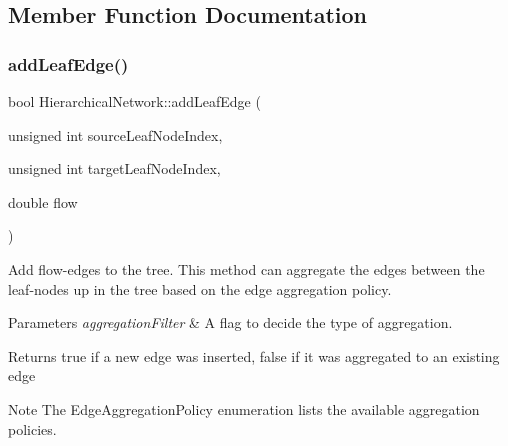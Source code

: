\subsection{Member Function Documentation}
\mbox{\label{classHierarchicalNetwork_afe1778c66f0b4444d70db38214b43ee1}} 
\subsubsection{\texorpdfstring{add\+Leaf\+Edge()}{addLeafEdge()}}
{\footnotesize\ttfamily bool Hierarchical\+Network\+::add\+Leaf\+Edge (\begin{DoxyParamCaption}\item[{unsigned int}]{source\+Leaf\+Node\+Index,  }\item[{unsigned int}]{target\+Leaf\+Node\+Index,  }\item[{double}]{flow }\end{DoxyParamCaption})}

Add flow-\/edges to the tree. This method can aggregate the edges between the leaf-\/nodes up in the tree based on the edge aggregation policy. 
\begin{DoxyParams}{Parameters}
{\em aggregation\+Filter} & A flag to decide the type of aggregation. \\
\hline
\end{DoxyParams}
\begin{DoxyReturn}{Returns}
true if a new edge was inserted, false if it was aggregated to an existing edge 
\end{DoxyReturn}
\begin{DoxyNote}{Note}
The Edge\+Aggregation\+Policy enumeration lists the available aggregation policies. 
\end{DoxyNote}

